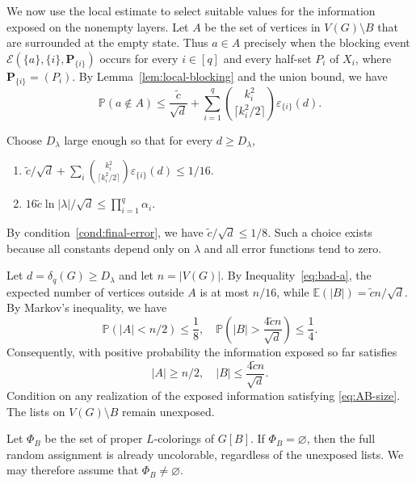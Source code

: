 \documentclass[12pt]{article}
\numberwithin{equation}{section}
\theoremstyle{definition}
\newcommand{\Prob}{\mathbb{P}}
\newcommand{\Ex}{\mathbb{E}}
\begin{document}
We now use the local estimate to select suitable values for the information
exposed on the nonempty layers. Let $A$ be the set of vertices in
$V(G) \setminus B$ that are
surrounded at the empty state. Thus $a \in A$ precisely when the
blocking event $\mathcal{E}(\{a\},\{i\},\mathbf{P}_{\{i\}})$ occurs for every
$i \in [q]$ and every half-set $P_i$ of $X_i$, where
$\mathbf{P}_{\{i\}} = (P_i)$. By Lemma~\ref{lem:local-blocking} and the union
bound, we have
\begin{equation}\label{eq:bad-a}
 \Prob(a \notin A)
 \leq \frac{\widetilde{c}}{\sqrt{d}}
 +\sum_{i = 1}^q
 \binom{k_i^2}{\lceil k_i^2/2\rceil}
 \varepsilon_{\{i\}}(d).
\end{equation}

Choose $D_\lambda$ large enough so that for every $d \geq D_\lambda$,
\begin{enumerate}[label=(D\arabic*),ref=(D\arabic*),labelindent=2em,
	leftmargin=*, itemsep=0.5em,topsep=0.7em]
\item\label{cond:final-error} $\widetilde{c}/\sqrt{d}
+\sum_i\binom{k_i^2}{\lceil k_i^2/2\rceil}
\varepsilon_{\{i\}}(d) \leq 1/16$.
\item\label{cond:final-union} $16\widetilde{c}\ln |\lambda|/\sqrt{d}
 \leq \prod_{i = 1}^q \alpha_i$.
\end{enumerate}
By condition~\ref{cond:final-error}, we have
$\widetilde{c}/\sqrt{d} \leq 1/8$. Such a choice exists
because all constants depend only on $\lambda$ and all error functions tend
to zero.

Let $d = \delta_q(G) \geq D_\lambda$ and let $n = |V(G)|$. By
Inequality~\eqref{eq:bad-a}, the expected number of vertices outside $A$ is at
most $n/16$, while $\Ex(|B|) = \widetilde{c}n/\sqrt{d}$.
By Markov's inequality, we have
\[
 \Prob(|A| < n/2) \leq \frac{1}{8},
 \quad
 \Prob\left(|B| > \frac{4\widetilde{c}n}{\sqrt{d}}\right) \leq \frac{1}{4}.
\]
Consequently, with positive probability the information exposed so far satisfies
\begin{equation}\label{eq:AB-size}
 |A| \geq n/2,
 \quad
 |B| \leq \frac{4\widetilde{c}n}{\sqrt{d}}.
\end{equation}
Condition on any realization of the exposed information satisfying
\eqref{eq:AB-size}. The lists on
$V(G)\setminus B$ remain unexposed.

Let $\Phi_B$ be the set of proper $L$-colorings of $G[B]$.
If $\Phi_B = \varnothing$, then the full random assignment is already
uncolorable, regardless of the unexposed lists. We may therefore assume that
$\Phi_B \ne \varnothing$.
\end{document}
